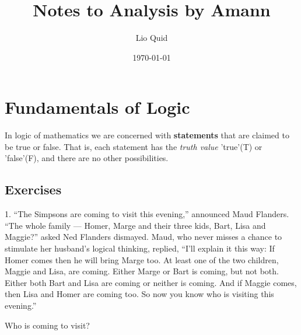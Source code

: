 \documentclass{article}
\title{Notes to Analysis by Amann}
\date{\today}
\author{Lio Quid}
\theoremstyle{definition}
\theoremstyle{remark}
\begin{document}
\maketitle
\tableofcontents
\newpage 

\section{Fundamentals of Logic}
In logic of mathematics we are concerned with \textbf{statements} that are claimed to be true or false.
That is, each statement has the \textit{truth value} 'true'(T) or 'false'(F),
and there are no other possibilities.

\subsection{Exercises}
1. ``The Simpsons are coming to visit this evening,'' announced Maud Flanders.
``The whole family — Homer, Marge and their three kids, Bart, Lisa and Maggie?'' asked Ned Flanders dismayed. 
Maud, who never misses a chance to stimulate her husband's logical thinking, replied, 
``I'll explain it this way: 
If Homer comes then he will bring Marge too.
At least one of the two children, Maggie and Lisa, are coming. 
Either Marge or Bart is coming, but not both. 
Either both Bart and Lisa are coming or neither is coming. 
And if Maggie comes, then Lisa and Homer are coming too. 
So now you know who is visiting this evening.''

Who is coming to visit?
\end{document}
